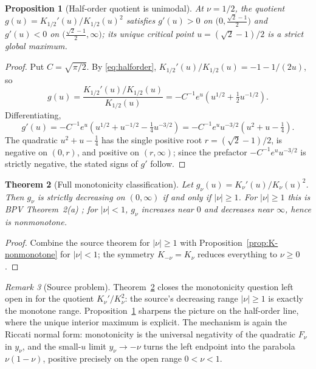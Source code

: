 \documentclass[preprint,12pt]{elsarticle}
\theoremstyle{plain}
\newtheorem{theorem}{Theorem}[section]
\newtheorem{proposition}[theorem]{Proposition}
\theoremstyle{definition}
\theoremstyle{remark}
\newtheorem{remark}[theorem]{Remark}
\begin{document}
\begin{proposition}[Half-order quotient is unimodal]
\label{prop:halforder-unimodal}
At \(\nu=1/2\), the quotient \(g(u)=K_{1/2}'(u)/K_{1/2}(u)^2\) satisfies
\(g'(u)>0\) on \(\bigl(0,\tfrac{\sqrt2-1}{2}\bigr)\) and \(g'(u)<0\) on
\(\bigl(\tfrac{\sqrt2-1}{2},\infty\bigr)\); its unique critical point
\(u=(\sqrt2-1)/2\) is a strict global maximum.
\end{proposition}
\begin{proof}
Put \(C=\sqrt{\pi/2}\). By \eqref{eq:halforder},
\(K_{1/2}'(u)/K_{1/2}(u)=-1-1/(2u)\), so
\begin{equation}
g(u)=\frac{K_{1/2}'(u)/K_{1/2}(u)}{K_{1/2}(u)}
=-C^{-1}e^{u}\left(u^{1/2}+\tfrac12u^{-1/2}\right).
\end{equation}
Differentiating,
\begin{equation}
g'(u)
=-C^{-1}e^{u}\left(u^{1/2}+u^{-1/2}-\tfrac14u^{-3/2}\right)
=-C^{-1}e^{u}u^{-3/2}\left(u^2+u-\tfrac14\right).
\end{equation}
The quadratic \(u^2+u-\tfrac14\) has the single positive root
\(r=(\sqrt2-1)/2\), is negative on \((0,r)\), and positive on
\((r,\infty)\); since the prefactor \(-C^{-1}e^{u}u^{-3/2}\) is strictly
negative, the stated signs of \(g'\) follow.
\end{proof}

\begin{theorem}[Full monotonicity classification]\label{thm:K-classification}
Let \(g_\nu(u)=K_\nu'(u)/K_\nu(u)^2\). Then \(g_\nu\) is strictly decreasing on
\((0,\infty)\) if and only if \(|\nu|\ge1\). For \(|\nu|\ge1\) this is BPV
Theorem~2(a) \cite{bpv}; for \(|\nu|<1\), \(g_\nu\) increases near \(0\)
and decreases near \(\infty\), hence is nonmonotone.
\end{theorem}
\begin{proof}
Combine the source theorem \cite[Theorem~2(a)]{bpv} for \(|\nu|\ge1\) with
Proposition~\ref{prop:K-nonmonotone} for \(|\nu|<1\); the symmetry
\(K_{-\nu}=K_\nu\) reduces everything to \(\nu\ge0\).
\end{proof}

\begin{remark}[Source problem]
Theorem~\ref{thm:K-classification} closes the monotonicity question left
open in \cite{bpv} for the quotient \(K_\nu'/K_\nu^2\): the source's
decreasing range \(|\nu|\ge1\) is exactly the monotone range.
Proposition~\ref{prop:halforder-unimodal} sharpens the picture on the
half-order line, where the unique interior maximum is explicit. The mechanism is
again the Riccati normal form: monotonicity is the universal negativity of
the quadratic \(F_\nu\) in \(y_\nu\), and the small-\(u\) limit
\(y_\nu\to-\nu\) turns the left endpoint into the parabola
\(\nu(1-\nu)\), positive precisely on the open range \(0<\nu<1\).
\end{remark}
\end{document}
